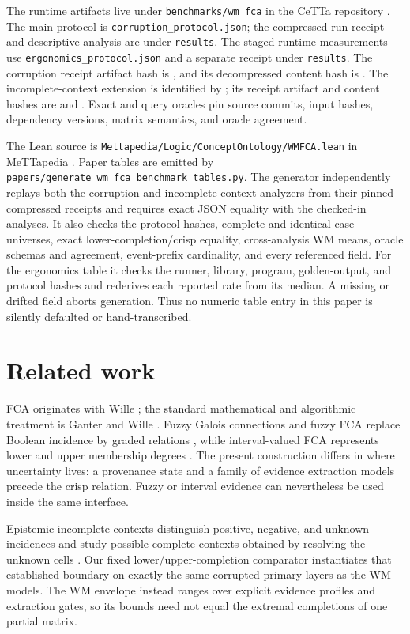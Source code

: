 \documentclass[11pt]{article}
\newcommand{\code}[1]{\nolinkurl{#1}}
\begin{document}
The runtime artifacts live under \code{benchmarks/wm_fca} in the CeTTa
repository \cite{cetta}. The main protocol is
\code{corruption_protocol.json}; the compressed run receipt and descriptive
analysis are under \code{results}. The staged runtime measurements use
\code{ergonomics_protocol.json} and a separate receipt under \code{results}.
The corruption receipt artifact hash is
\WMFCAReceiptHash, and its decompressed content hash is
\WMFCAReceiptContentHash. The incomplete-context extension is identified by
\WMFCAIncompleteProtocolHash; its receipt artifact and content hashes are
\WMFCAIncompleteReceiptHash{} and \WMFCAIncompleteReceiptContentHash.
Exact and query oracles pin source commits, input hashes, dependency versions,
matrix semantics, and oracle agreement.

The Lean source is
\code{Mettapedia/Logic/ConceptOntology/WMFCA.lean} in MeTTapedia
\cite{mettapedia}. Paper tables are emitted by
\code{papers/generate_wm_fca_benchmark_tables.py}. The generator independently
replays both the corruption and incomplete-context analyzers from their pinned
compressed receipts and requires exact JSON equality with the checked-in
analyses. It also checks the protocol hashes, complete and identical case
universes, exact lower-completion/crisp equality, cross-analysis WM means,
oracle schemas and agreement, event-prefix cardinality, and every referenced
field. For the ergonomics table it checks the runner, library, program,
golden-output, and protocol hashes and rederives each reported rate from its
median. A missing or drifted field aborts generation. Thus no numeric table
entry in this paper is silently defaulted or hand-transcribed.

\section{Related work}

FCA originates with Wille \cite{wille1982}; the standard mathematical and
algorithmic treatment is Ganter and Wille \cite{ganterwille1999}. Fuzzy Galois
connections and fuzzy FCA replace Boolean incidence by graded relations
\cite{belohlavek1999}, while interval-valued FCA represents lower and upper
membership degrees \cite{djouadi2009}. The present construction differs in
where uncertainty lives: a provenance state and a family of evidence
extraction models precede the crisp relation. Fuzzy or interval evidence can
nevertheless be used inside the same interface.

Epistemic incomplete contexts distinguish positive, negative, and unknown
incidences and study possible complete contexts obtained by resolving the
unknown cells \cite{chacongomez2026}. Our fixed lower/upper-completion
comparator instantiates that established boundary on exactly the same
corrupted primary layers as the WM models. The WM envelope instead ranges over
explicit evidence profiles and extraction gates, so its bounds need not equal
the extremal completions of one partial matrix.
\end{document}
